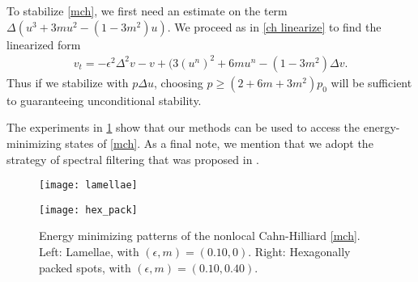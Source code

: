 To stabilize \cref{mch}, we first need an estimate on the term $\Delta(u^3 + 3mu^2-(1-3m^2)u)$. We proceed as in \cref{ch linearize} to find the linearized form
\begin{align}
v_t = -\epsilon^2\Delta^2 v - v + (3(u^n)^2 + 6mu^n - (1-3m^2) \Delta v.
\end{align}
Thus if we stabilize with $p\Delta u$, choosing $p \geq (2+6m+3m^2)p_0$ will be sufficient to guaranteeing unconditional stability.

The experiments in \cref{fig:mchp energy minimizers}  show that our methods can be used to access the energy-minimizing states of \cref{mch}. As a final note, we mention that we adopt the strategy of spectral filtering that was proposed in \cite{choksi20112d}.

\begin{figure}[htb!]
        \centering
\begin{minipage}{0.45\textwidth}
       \texttt{[image: lamellae]}
\end{minipage}
\begin{minipage}{0.45\textwidth}
       \texttt{[image: hex\_pack]}
\end{minipage}
\caption[{Energy minimizing patterns of the nonlocal Cahn-Hilliard \cref{mch}.}]{Energy minimizing patterns of the nonlocal Cahn-Hilliard \cref{mch}. Left: Lamellae, with $(\epsilon,m)=(0.10,0)$. Right: Hexagonally packed spots, with $(\epsilon,m)=(0.10,0.40)$.}
\label{fig:mchp energy minimizers}
\end{figure}
